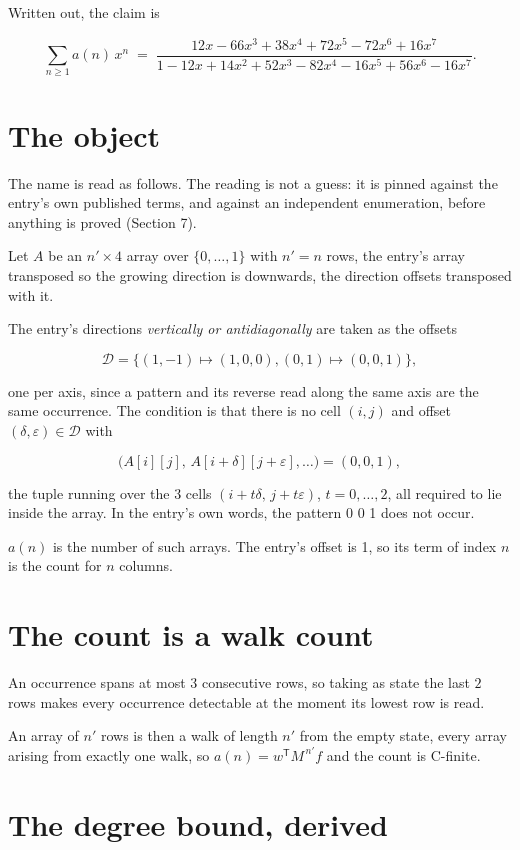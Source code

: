 \documentclass[11pt]{article}
\theoremstyle{definition}
\begin{document}
Written out, the claim is

\[\sum_{n \ge 1} a(n)\,x^n \;=\; \frac{12x - 66x^{3} + 38x^{4} + 72x^{5} - 72x^{6} + 16x^{7}}{1 - 12x + 14x^{2} + 52x^{3} - 82x^{4} - 16x^{5} + 56x^{6} - 16x^{7}}.\]

\section{The object}

The name is read as follows. The reading is not a guess: it is pinned against the entry's own published terms, and against an independent enumeration, before anything is proved (Section 7).

Let $A$ be an $n' \times 4$ array over $\{0,\dots,1\}$ with $n' = n$ rows, the entry's array transposed so the growing direction is downwards, the direction offsets transposed with it.

The entry's directions {\itshape vertically or antidiagonally} are taken as the offsets

\[\mathcal{D} = \{(1,-1)\mapsto(1,0,0), (0,1)\mapsto(0,0,1)\},\]

one per axis, since a pattern and its reverse read along the same axis are the same occurrence. The condition is that there is no cell $(i,j)$ and offset $(\delta,\varepsilon)\in\mathcal{D}$ with

\[\bigl(A[i][j],\,A[i{+}\delta][j{+}\varepsilon],\dots\bigr) = (0, 0, 1),\]

the tuple running over the $3$ cells $(i+t\delta,\,j+t\varepsilon)$, $t = 0,\dots,2$, all required to lie inside the array. In the entry's own words, the pattern 0 0 1 does not occur.

$a(n)$ is the number of such arrays. The entry's offset is 1, so its term of index $n$ is the count for $n$ columns.

\section{The count is a walk count}

An occurrence spans at most $3$ consecutive rows, so taking as state the last $2$ rows makes every occurrence detectable at the moment its lowest row is read.

An array of $n'$ rows is then a walk of length $n'$ from the empty state, every array arising from exactly one walk, so $a(n) = w^{\mathsf T}M^{\,n'}f$ and the count is C-finite.

\section{The degree bound, derived}
\end{document}
